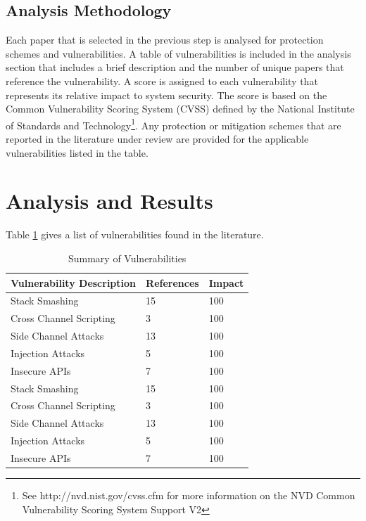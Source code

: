 \documentclass[draftcls,onecolumn,conference,12pt]{IEEEtran}
\begin{document}
\subsection{Analysis Methodology}

Each paper that is selected in the previous step is analysed for protection schemes and vulnerabilities.  A table of vulnerabilities is included in the analysis section that includes a brief description and the number of unique papers that reference the vulnerability. A score is assigned to each vulnerability that represents its relative impact to system security. The score is based on the Common Vulnerability Scoring System (CVSS) defined by the National Institute of Standards and Technology\footnote{See http://nvd.nist.gov/cvss.cfm for more information on the NVD Common Vulnerability Scoring System Support V2}.  Any protection or mitigation schemes that are reported in the literature under review are provided for the applicable vulnerabilities listed in the table.  

\section{Analysis and Results}

Table \ref{tab:vul_summary} gives a list of vulnerabilities found in the literature.

\begin{table}[!t]
\renewcommand{\arraystretch}{1.3}
\caption{Summary of Vulnerabilities}
\label{tab:vul_summary}
\centering
\begin{tabular}{ | p{5cm} | l | l | }
\hline
 Vulnerability Description 		& References & Impact	\\ \hline
 Stack Smashing					& 15 & 100 				\\ \hline
 Cross Channel Scripting			& 3 & 100				\\ \hline
 Side Channel Attacks 			& 13 & 100 				\\ \hline
 Injection Attacks				& 5 & 100 				\\ \hline
 Insecure APIs 					& 7 & 100				\\ \hline
 Stack Smashing					& 15 & 100 				\\ \hline
 Cross Channel Scripting			& 3 & 100				\\ \hline
 Side Channel Attacks 			& 13 & 100 				\\ \hline
 Injection Attacks				& 5 & 100 				\\ \hline
 Insecure APIs 					& 7 & 100				\\ \hline
\end{tabular}
\end{table}
\end{document}
